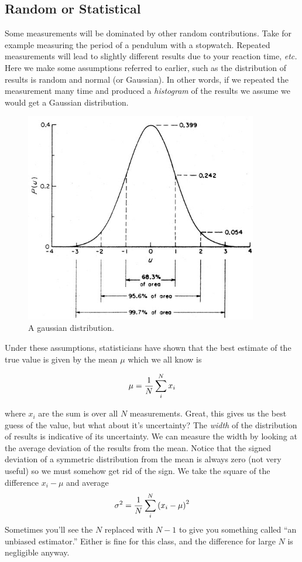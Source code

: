 \documentclass{article}
\begin{document}
\subsection{Random or Statistical}
Some measurements will be dominated by other random contributions.  Take for example measuring the period of a pendulum with a stopwatch.  Repeated measurements will lead to slightly different results due to your reaction time, {\em etc.}  Here we make some assumptions referred to earlier, such as the distribution of results is random and normal (or Gaussian).  In other words, if we repeated the measurement many time and produced a {\em histogram} of the results we assume we would get a Gaussian distribution.

\begin{figure}
\includegraphics[width=4in]{images/gaussian.jpg}
\caption{A gaussian distribution.}
\label{fig:gaussian}
\end{figure}

Under these assumptions, statisticians have shown that the best estimate of the true value is given by the mean $\mu$ which we all know is

\begin{equation}
\mu = { 1 \over N } \sum_i^N x_i
\end{equation}

where $x_i$ are the sum is over all $N$ measurements.  Great, this gives us the best guess of the value, but what about it's uncertainty?  The {\em width} of the distribution of results is indicative of its uncertainty.  We can measure the width by looking at the average deviation of the results from the mean.  Notice that the signed deviation of a symmetric distribution from the mean is always zero (not very useful) so we must somehow get rid of the sign.  We take the square of the difference $x_i - \mu$ and average
\begin{equation}
\sigma^2 = {1\over N} \sum_i^N \left( x_i - \mu \right)^2
\end{equation}
Sometimes you'll see the $N$ replaced with $N-1$ to give you something called ``an unbiased estimator.''  Either is fine for this class, and the difference for large $N$ is negligible anyway.
\end{document}

